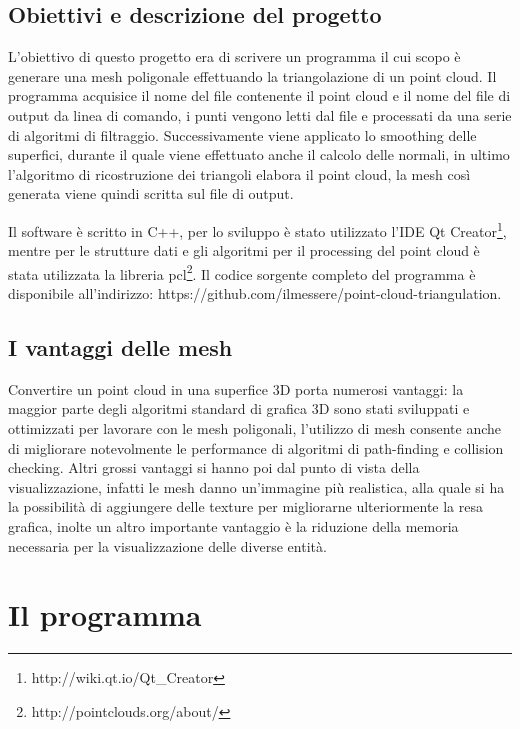 \documentclass[a4paper,12pt]{article}
\begin{document}
	\subsection{Obiettivi e descrizione del progetto}
	L'obiettivo di questo progetto era di scrivere un programma il cui scopo è generare una mesh poligonale effettuando la
	triangolazione di un point cloud. 
  Il programma acquisice il nome del file contenente il point cloud e il nome del file di output da linea di comando,
	i punti vengono letti dal file e processati da una serie di algoritmi di filtraggio. 
	Successivamente viene applicato lo smoothing delle superfici, durante il quale viene effettuato anche il calcolo delle
	normali, in ultimo l'algoritmo di ricostruzione dei triangoli elabora il point cloud, la mesh così generata viene quindi
	scritta sul file di output.  
	
	Il software è scritto in C++, per lo sviluppo è stato utilizzato l'IDE Qt Creator\footnote{http://wiki.qt.io/Qt\_Creator},
	mentre per le strutture dati e gli algoritmi per il processing del point cloud è stata utilizzata la libreria
	pcl\footnote{http://pointclouds.org/about/}.	
	Il codice sorgente completo del programma è disponibile all'indirizzo: 
	https://github.com/ilmessere/point-cloud-triangulation.
	   	
	\subsection{I vantaggi delle mesh}
	Convertire un point cloud in una superfice 3D porta numerosi vantaggi: la maggior parte degli algoritmi standard di grafica
	3D sono stati sviluppati e ottimizzati per lavorare con le mesh poligonali, l'utilizzo di mesh consente anche di migliorare 
	notevolmente le performance di algoritmi di path-finding e collision checking. Altri grossi vantaggi si hanno poi dal punto
	di vista della visualizzazione, infatti le mesh danno un'immagine più realistica, alla quale si ha la possibilità di
	aggiungere delle texture per migliorarne ulteriormente la resa grafica, inolte un altro importante vantaggio è la riduzione
	della memoria necessaria per la visualizzazione delle diverse entità. 
	
\clearpage
\section{Il programma}
\end{document}
